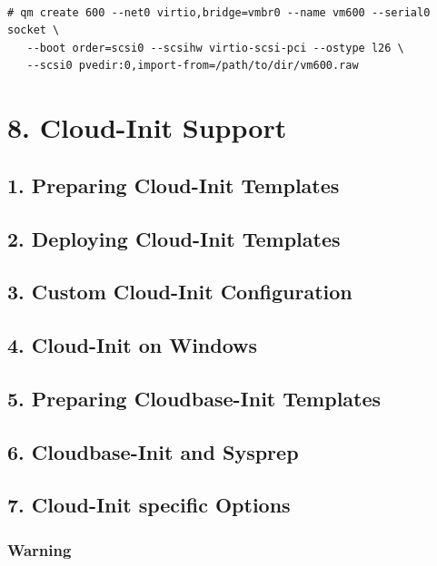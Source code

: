 \begin{lstlisting}

# qm create 600 --net0 virtio,bridge=vmbr0 --name vm600 --serial0 socket \
   --boot order=scsi0 --scsihw virtio-scsi-pci --ostype l26 \
   --scsi0 pvedir:0,import-from=/path/to/dir/vm600.raw

\end{lstlisting}


\section{8. Cloud-Init Support}

\subsection{1. Preparing Cloud-Init Templates}

\subsection{2. Deploying Cloud-Init Templates}

\subsection{3. Custom Cloud-Init Configuration}

\subsection{4. Cloud-Init on Windows}

\subsection{5. Preparing Cloudbase-Init Templates}

\subsection{6. Cloudbase-Init and Sysprep}

\subsection{7. Cloud-Init specific Options}

\subsubsection{Warning}


